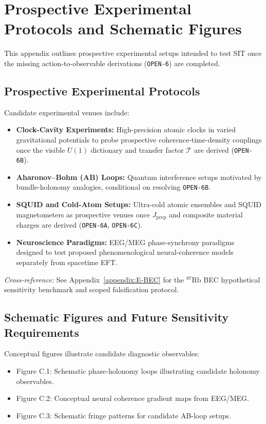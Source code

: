 \section{Prospective Experimental Protocols and Schematic Figures}
\label{appendix:C}

This appendix outlines prospective experimental setups intended to test SIT once the missing action-to-observable derivations (\texttt{OPEN-6}) are completed.

\subsection{Prospective Experimental Protocols}

Candidate experimental venues include:

\begin{itemize}
    \item \textbf{Clock-Cavity Experiments:} High-precision atomic clocks in varied gravitational potentials to probe prospective coherence-time-density couplings once the visible $U(1)$ dictionary and transfer factor $\mathcal{T}$ are derived (\texttt{OPEN-6B}).
    \item \textbf{Aharonov--Bohm (AB) Loops:} Quantum interference setups motivated by bundle-holonomy analogies, conditional on resolving \texttt{OPEN-6B}.
    \item \textbf{SQUID and Cold-Atom Setups:} Ultra-cold atomic ensembles and SQUID magnetometers as prospective venues once $J_{\mathrm{prep}}$ and composite material charges are derived (\texttt{OPEN-6A}, \texttt{OPEN-6C}).
    \item \textbf{Neuroscience Paradigms:} EEG/MEG phase-synchrony paradigms designed to test proposed phenomenological neural-coherence models separately from spacetime EFT.
\end{itemize}

\noindent\textit{Cross-reference:} See Appendix~\ref{appendix:E-BEC} for the $^{87}$Rb BEC hypothetical sensitivity benchmark and scoped falsification protocol.

\subsection{Schematic Figures and Future Sensitivity Requirements}

Conceptual figures illustrate candidate diagnostic observables:

\begin{itemize}
    \item Figure C.1: Schematic phase-holonomy loops illustrating candidate holonomy observables.
    \item Figure C.2: Conceptual neural coherence gradient maps from EEG/MEG.
    \item Figure C.3: Schematic fringe patterns for candidate AB-loop setups.
\end{itemize}

